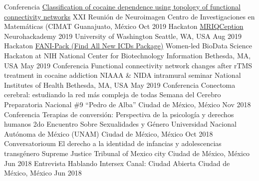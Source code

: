 \begin{cvproceedings}
    \cvproceeding
        {Conferencia}
        {\href{https://soffiafdz.github.io/slides/neuroimagenXXI.html}{Classification of cocaine dependence using topology of functional connectivity networks}}
        {XXI Reunión de Neuroimagen}
        {Centro de Investigaciones en Matemáticas (CIMAT}
        {Guanajuato, México}
        {Oct 2019}
    \cvproceeding
        {Hackaton}
        {\href{https://github.com/elizabethbeard/mriqception}{MRIQCeption}}
        {Neurohackademy 2019}
        {University of Washington}
        {Seattle, WA, USA}
        {Aug 2019}
    \cvproceeding
        {Hackaton}
        {\href{https://github.com/NCBI-Hackathons/Design-of-ICD-9-to-10-conversion-function-for-the-R-package-icd}{FANI-Pack (Find All New ICDs Package)}}
        {Women-led BioData Science Hackaton at NIH}
        {National Center for Biotechnology Information}
        {Bethesda, MA, USA}
        {May 2019}
    \cvproceeding
        {Conferencia}
        {Functional connectivity network changes after rTMS treatment in cocaine addiction}
        {NIAAA \& NIDA intramural seminar}
        {National Institutes of Health}
        {Bethesda, MA, USA}
        {May 2019}
    \cvproceeding
        {Conferencia}
        {Conectoma cerebral: estudiando la red más compleja de todas}
        {Semana del Cerebro}
        {Preparatoria Nacional \#9 ``Pedro de Alba''}
        {Ciudad de México, México}
        {Nov 2018}
    \cvproceeding
        {Conferencia}
        {Terapias de conversión: Perspectiva de la psicología y derechos humanos}
        {2do Encuentro Sobre Sexualidades y Género}
        {Universidad Nacional Autónoma de México (UNAM)}
        {Ciudad de México, México}
        {Oct 2018}
    \cvproceeding
        {Conversatorioum}
        {El derecho a la identidad de infancias y adolescencias transgénero}
        {}
        {Supreme Justice Tribunal of Mexico city}
        {Ciudad de México, México}
        {Jun 2018}
    \cvproceeding
        {Entrevista}
        {Hablando Intersex}
        {}
        {Canal: Ciudad Abierta}
        {Ciudad de México, México}
        {Jun 2018}
\end{cvproceedings}
